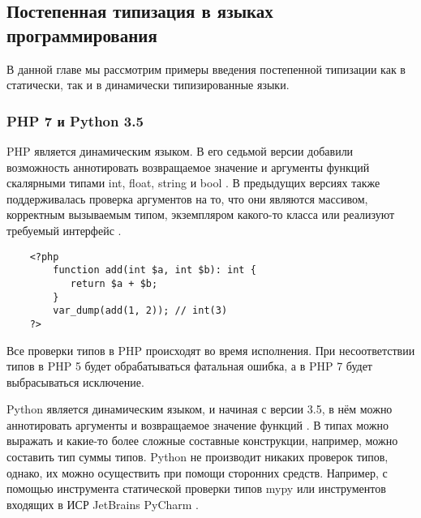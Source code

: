 \subsection{Постепенная типизация в языках программирования}

В данной главе мы рассмотрим примеры введения постепенной типизации как в статически, так и в динамически типизированные языки.
\subsubsection{PHP 7 и Python 3.5}

PHP является динамическим языком. В его седьмой версии добавили возможность аннотировать возвращаемое значение и аргументы функций скалярными типами int, float, string и bool \cite{wiki:phpScalarTypeHints}. В предыдущих версиях также поддерживалась проверка аргументов на то, что они являются массивом, корректным вызываемым типом, экземпляром какого-то класса или реализуют требуемый интерфейс \cite{wiki:phpTypeHints}.

\begin{verbatim}
    <?php        
        function add(int $a, int $b): int {
           return $a + $b;
        }
        var_dump(add(1, 2)); // int(3)
    ?>
\end{verbatim}
 

Все проверки типов в PHP происходят во время исполнения. При несоответствии типов в PHP 5 будет обрабатываться фатальная ошибка, а в PHP 7 будет выбрасываться исключение.%

Python является динамическим языком, и начиная с версии 3.5, в нём можно аннотировать аргументы и возвращаемое значение функций \cite{wiki:pythonPep484TypeHints}. В типах можно выражать и какие-то более сложные составные конструкции, например, можно составить тип суммы типов. %
%    
Python не производит никаких проверок типов, однако, их можно осуществить при помощи сторонних средств. Например, с помощью инструмента статической проверки типов mypy \cite{python:mypyHomepage} или инструментов входящих в ИСР JetBrains PyCharm \cite{python:PyCharmHomepage}.

